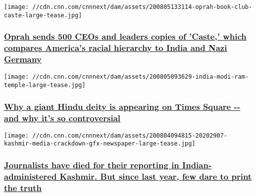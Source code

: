\href{/2020/08/05/us/oprah-caste-isabel-wilkerson-trnd/index.html}{}

\texttt{[image: //cdn.cnn.com/cnnnext/dam/assets/200805133114-oprah-book-club-caste-large-tease.jpg]}

\hypertarget{oprah-sends-500-ceos-and-leaders-copies-of-caste-which-compares-americas-racial-hierarchy-to-india-and-nazi-germany-}{%
\subsubsection{\texorpdfstring{\href{/2020/08/05/us/oprah-caste-isabel-wilkerson-trnd/index.html}{Oprah
sends 500 CEOs and leaders copies of 'Caste,' which compares America's
racial hierarchy to India and Nazi Germany
}}{Oprah sends 500 CEOs and leaders copies of 'Caste,' which compares America's racial hierarchy to India and Nazi Germany }}\label{oprah-sends-500-ceos-and-leaders-copies-of-caste-which-compares-americas-racial-hierarchy-to-india-and-nazi-germany-}}

\href{/2020/08/05/us/hindu-deity-times-square-trnd/index.html}{}

\texttt{[image: //cdn.cnn.com/cnnnext/dam/assets/200805093629-india-modi-ram-temple-large-tease.jpg]}

\hypertarget{why-a-giant-hindu-deity-is-appearing-on-times-square----and-why-its-so-controversial-}{%
\subsubsection{\texorpdfstring{\href{/2020/08/05/us/hindu-deity-times-square-trnd/index.html}{Why
a giant Hindu deity is appearing on Times Square -\/- and why it's so
controversial
}}{Why a giant Hindu deity is appearing on Times Square -\/- and why it's so controversial }}\label{why-a-giant-hindu-deity-is-appearing-on-times-square----and-why-its-so-controversial-}}

\href{/2020/08/04/media/kashmir-media-freedom-dst-hnk-intl/index.html}{}

\texttt{[image: //cdn.cnn.com/cnnnext/dam/assets/200804094815-20202907-kashmir-media-crackdown-gfx-newspaper-large-tease.jpg]}

\hypertarget{journalists-have-died-for-their-reporting-in-indian-administered-kashmir-but-since-last-year-few-dare-to-print-the-truth-}{%
\subsubsection{\texorpdfstring{\href{/2020/08/04/media/kashmir-media-freedom-dst-hnk-intl/index.html}{Journalists
have died for their reporting in Indian-administered Kashmir. But since
last year, few dare to print the truth
}}{Journalists have died for their reporting in Indian-administered Kashmir. But since last year, few dare to print the truth }}\label{journalists-have-died-for-their-reporting-in-indian-administered-kashmir-but-since-last-year-few-dare-to-print-the-truth-}}


